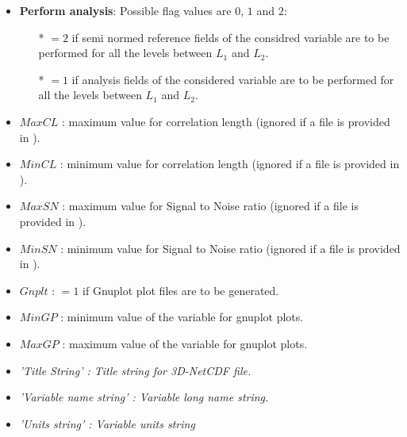 {\begin{itemize}
\begin{itemize}
                \item[*] $=10$ if correlation length parameters are to be estimated using data mean distance as a minimum,
                \item[*] $=-10$ if correlation length parameters are to be estimated using data mean distance as a minimum and vertically filtered,
                \item[*] $=30$ if both  correlation length and  signal to noise ratio parameters are to be estimated using data mean distance as a minimum (for $CL$),
                \item[*] $=-30$ if both  correlation length and  signal to noise ratio parameters are to be estimated using data mean distance as a minimum (for $CL$), and both parameters vertically filtered.
              \end{itemize}

\item {\bf Perform analysis}: Possible flag values are $0$, $1$ and $2$:
              \begin{itemize}
                \item[*] $=2$ if semi normed reference fields of the considred variable are to be performed for all the levels between $L_1$ and $L_2$.
                \item[*] $=1$ if analysis fields of the considered variable are to be performed for all the levels between $L_1$ and $L_2$.
              \end{itemize}
\item $MaxCL$ : maximum value for correlation length (ignored if a  file is provided in ).
\item $MinCL$ : minimum value for correlation length  (ignored if a  file is provided in ).
\item $MaxSN$ : maximum value for Signal to Noise ratio (ignored if a  file is provided in ).
\item $MinSN$ : minimum value for Signal to Noise ratio (ignored if a  file is provided in ).
\item $Gnplt$ : $=1$ if Gnuplot plot files are to be generated.
\item $MinGP$ : minimum value of the variable for gnuplot plots.
\item $MaxGP$ : maximum value of the variable for gnuplot plots.
\item \it{'Title String'} : Title string for 3D-NetCDF file.
\item \it{'Variable name string'} : Variable long name string.
\item \it{'Units string'} : Variable units string
\end{itemize}


}

